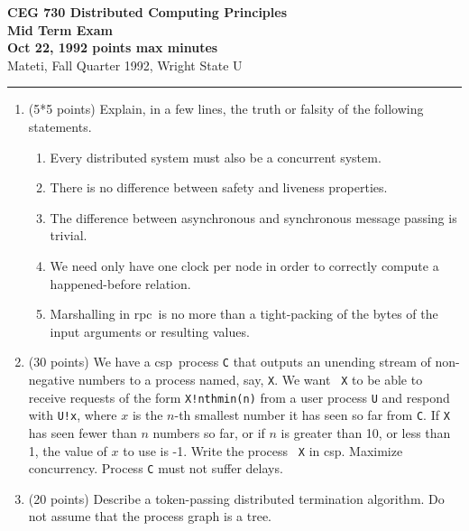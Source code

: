 \def\fat{\framebox[1mm]{\rule{0mm}{2mm}}}
\def\CSP{{\sc csp}}
\def\RPC{{\sc rpc}}
\parindent=0pt



{\bf CEG 
\large \bf 730 Distributed Computing Principles\\[5pt]
\large Mid Term Exam\\[10pt]
Oct 22, 1992  points max  minutes\\
}
\bigskip
{Mateti,  Fall Quarter 1992, Wright State U}\\[-5pt]
\hrule

\begin{enumerate}

\item (5*5 points)
Explain, in a few lines, the truth or falsity of the following
statements.

\begin{enumerate}
\item
Every distributed system must also be a concurrent system.

\item
There is no difference between safety and liveness properties.

\item
The difference between asynchronous and synchronous message
passing is trivial.

\item
We need only have one clock per node in order to correctly compute a
happened-before relation.

\item Marshalling in \RPC\ is no more than a tight-packing
of the bytes of the input arguments or resulting values.

\end{enumerate}

\item (30 points)
We have a \CSP\ process {\tt C} that outputs an unending stream of
non-negative numbers to a process named, say, {\tt X}.  We want {\tt
X} to be able to receive requests of the form {\tt X!nthmin(n)} from a
user process {\tt U} and respond with {\tt U!x}, where $x$ is the
$n$-th smallest number it has seen so far from {\tt C}.  If {\tt X}
has seen fewer than $n$ numbers so far, or if $n$ is greater than 10,
or less than 1, the value of $x$ to use is -1.  Write the process {\tt
X} in \CSP.  Maximize concurrency.  Process {\tt C} must not suffer
delays.

\item (20 points)
Describe a token-passing distributed termination algorithm.  Do not
assume that the process graph is a tree.



\end{enumerate}
